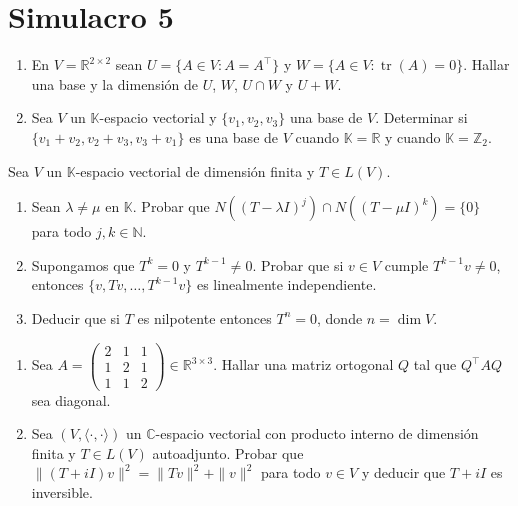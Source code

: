 \documentclass{article}
\newcommand{\R}{\mathbb{R}}
\newcommand{\N}{\mathbb{N}}
\newcommand{\C}{\mathbb{C}}
\newcommand{\K}{\mathbb{K}}
\DeclareMathOperator{\tr}{tr}
\newcommand{\ip}[2]{\langle #1, #2\rangle}
\newenvironment{ejercicio}[1]{\begin{trivlist}
\item[\hskip \labelsep {\bfseries #1.}]}{\end{trivlist}}
\begin{document}
\newpage
\section*{Simulacro 5}

\begin{ejercicio}{1}
    \begin{enumerate}
        \item En \( V = \R^{2 \times 2} \) sean \( U = \{A \in V : A = A^\top\} \) y \( W = \{A \in V : \tr(A) = 0\} \). Hallar una base y la dimensión de \( U \), \( W \), \( U \cap W \) y \( U + W \).
        \item Sea \( V \) un \( \K \)-espacio vectorial y \( \{v_1, v_2, v_3\} \) una base de \( V \). Determinar si \( \{v_1 + v_2, v_2 + v_3, v_3 + v_1\} \) es una base de \( V \) cuando \( \K = \R \) y cuando \( \K = \mathbb{Z}_2 \).
    \end{enumerate}
\end{ejercicio}

\begin{ejercicio}{2}
    Sea \( V \) un \( \K \)-espacio vectorial de dimensión finita y \( T \in L(V) \).
    \begin{enumerate}
        \item Sean \( \lambda \neq \mu \) en \( \K \). Probar que \( N((T - \lambda I)^j) \cap N((T - \mu I)^k) = \{0\} \) para todo \( j, k \in \N \).
        \item Supongamos que \( T^k = 0 \) y \( T^{k-1} \neq 0 \). Probar que si \( v \in V \) cumple \( T^{k-1} v \neq 0 \), entonces \( \{v, Tv, \dots, T^{k-1} v\} \) es linealmente independiente.
        \item Deducir que si \( T \) es nilpotente entonces \( T^n = 0 \), donde \( n = \dim V \).
    \end{enumerate}
\end{ejercicio}

\begin{ejercicio}{3}
    \begin{enumerate}
        \item Sea \( A = \begin{pmatrix} 2 & 1 & 1 \\ 1 & 2 & 1 \\ 1 & 1 & 2 \end{pmatrix} \in \R^{3 \times 3} \). Hallar una matriz ortogonal \( Q \) tal que \( Q^\top A Q \) sea diagonal.
        \item Sea \( (V, \ip{\cdot}{\cdot}) \) un \( \C \)-espacio vectorial con producto interno de dimensión finita y \( T \in L(V) \) autoadjunto. Probar que \( \|(T + iI)v\|^2 = \|Tv\|^2 + \|v\|^2 \) para todo \( v \in V \) y deducir que \( T + iI \) es inversible.
    \end{enumerate}
\end{ejercicio}
\end{document}
